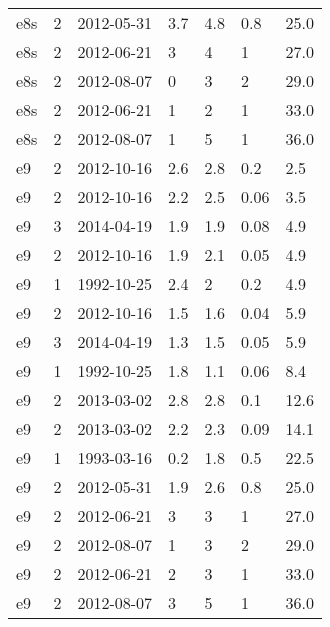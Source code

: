 \begin{table*}[htp]
\begin{tabular}{llll}
e8s & 2 & 2012-05-31 & 3.7 & 4.8 & 0.8 & 25.0 \\
e8s & 2 & 2012-06-21 & 3 & 4 & 1 & 27.0 \\
e8s & 2 & 2012-08-07 & 0 & 3 & 2 & 29.0 \\
e8s & 2 & 2012-06-21 & 1 & 2 & 1 & 33.0 \\
e8s & 2 & 2012-08-07 & 1 & 5 & 1 & 36.0 \\
e9 & 2 & 2012-10-16 & 2.6 & 2.8 & 0.2 & 2.5 \\
e9 & 2 & 2012-10-16 & 2.2 & 2.5 & 0.06 & 3.5 \\
e9 & 3 & 2014-04-19 & 1.9 & 1.9 & 0.08 & 4.9 \\
e9 & 2 & 2012-10-16 & 1.9 & 2.1 & 0.05 & 4.9 \\
e9 & 1 & 1992-10-25 & 2.4 & 2 & 0.2 & 4.9 \\
e9 & 2 & 2012-10-16 & 1.5 & 1.6 & 0.04 & 5.9 \\
e9 & 3 & 2014-04-19 & 1.3 & 1.5 & 0.05 & 5.9 \\
e9 & 1 & 1992-10-25 & 1.8 & 1.1 & 0.06 & 8.4 \\
e9 & 2 & 2013-03-02 & 2.8 & 2.8 & 0.1 & 12.6 \\
e9 & 2 & 2013-03-02 & 2.2 & 2.3 & 0.09 & 14.1 \\
e9 & 1 & 1993-03-16 & 0.2 & 1.8 & 0.5 & 22.5 \\
e9 & 2 & 2012-05-31 & 1.9 & 2.6 & 0.8 & 25.0 \\
e9 & 2 & 2012-06-21 & 3 & 3 & 1 & 27.0 \\
e9 & 2 & 2012-08-07 & 1 & 3 & 2 & 29.0 \\
e9 & 2 & 2012-06-21 & 2 & 3 & 1 & 33.0 \\
e9 & 2 & 2012-08-07 & 3 & 5 & 1 & 36.0 \\
\hline
\end{tabular}

\end{table*}

